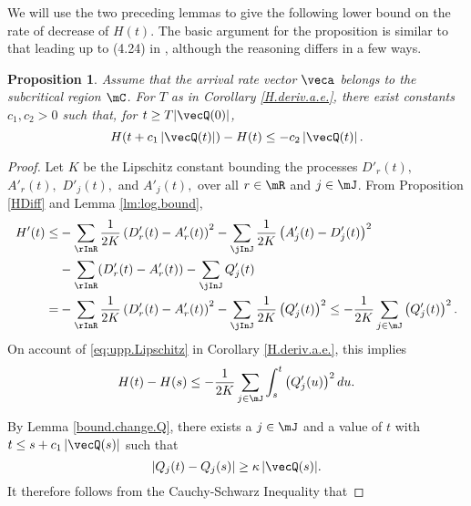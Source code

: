 \documentclass{amsart}
\newtheorem{proposition}{Proposition}
\begin{document}
We will use the two preceding lemmas to give the following lower bound on the rate of decrease of $H(t)$.  The basic argument for the proposition is similar to that leading up to (4.24) in \cite{Br96a},
although the reasoning differs in a few ways.  

\begin{proposition}\label{pr:der.H.boud.away.0}
Assume that the arrival rate vector $\veca$ belongs to the subcritical region $\mC$. 
For $T$ as in Corollary \ref{H.deriv.a.e.},  
there exist constants $c_1, c_2 >0$ such that, for $t\geq T|\vecQ(0)|$,
\begin{equation}\label{eq:H.dec.bound}
  H( t + c_1\, |\vecQ(t)|) - H(t) \le - c_2  \, |\vecQ(t)|  \,  .
\end{equation}
\end{proposition}
\begin{proof}
 
Let $K$ be the Lipschitz constant bounding the processes $D'_r(t),$ $A'_r(t),$ $D'_j(t),$ and $A'_j(t),$ over all $r\in\mR$ and $j\in\mJ$. From Proposition \ref{HDiff} and Lemma \ref{lm:log.bound}, 
\begin{align*}
H'(t) 
\leq & - \sum_\rInR \frac{1}{2 K} \left(D'_r(t)-A'_r(t) \right)^2 
- \sum_\jInJ \frac{1}{2 K} \left(A'_j(t)-D'_j(t) \right)^2\\
& - \sum_\rInR (D'_r(t)-A'_r(t))  - \sum_\jInJ Q'_j(t)\\
= & - \sum_\rInR \frac{1}{2 K} \left(D'_r(t)-A'_r(t) \right)^2 
- \sum_\jInJ \frac{1}{2 K} \left(Q'_j(t)\right)^2 
\leq - \frac{1}{2 K} \sum_{j\in\mJ} \left(Q'_j(t)\right)^2  .
\end{align*}
On account of \eqref{eq:upp.Lipschitz} in Corollary \ref{H.deriv.a.e.}, this implies
\begin{equation}
\label{eqquadraticbd}
H(t) - H(s) \leq -\frac{1}{2 K}  \sum_{j\in\mJ} \int_s^t \left(Q'_j(u)\right)^2 du. 
\end{equation}

By Lemma \ref{bound.change.Q}, there exists a $j\in\mJ$ and a value of $t$ with $t \leq s + c_1 \, |\vecQ(s)|$ such that
\begin{equation*}
 |Q_j(t) - Q_j(s)| \geq \kappa \, |\vecQ(s)|.
\end{equation*}
It therefore follows from the Cauchy-Schwarz Inequality that 


\end{proof}
\end{document}
